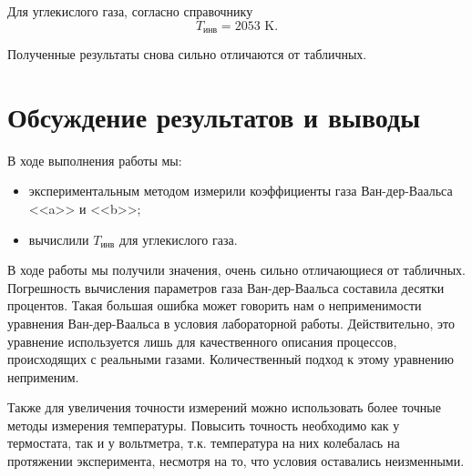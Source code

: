 \documentclass[a4paper,12pt]{article}
\theoremstyle{definition}
\begin{document}
	Для углекислого газа, согласно справочнику  \[ T_\text{инв} = 2053 \text{ K}.\]
	
	Полученные результаты снова сильно отличаются от табличных.
	
	\section{Обсуждение результатов и выводы}
	
	В ходе выполнения работы мы:
	
	\begin{itemize}
		\item экспериментальным методом измерили коэффициенты газа Ван-дер-Ваальса <<a>> и <<b>>;
		\item вычислили $ T_\text{инв} $ для углекислого газа.
	\end{itemize}
	
	В ходе работы мы получили значения, очень сильно отличающиеся от табличных. Погрешность вычисления параметров газа Ван-дер-Ваальса составила десятки процентов. Такая большая ошибка может говорить нам о неприменимости уравнения Ван-дер-Ваальса в условия лабораторной работы. Действительно, это уравнение используется лишь для качественного описания процессов, происходящих с реальными газами. Количественный подход к этому уравнению неприменим.
	
	Также для увеличения точности измерений можно использовать более точные методы измерения температуры. Повысить точность необходимо как у термостата, так и у вольтметра, т.к. температура на них колебалась на протяжении эксперимента, несмотря на то, что условия оставались неизменными.
	
\end{document}
